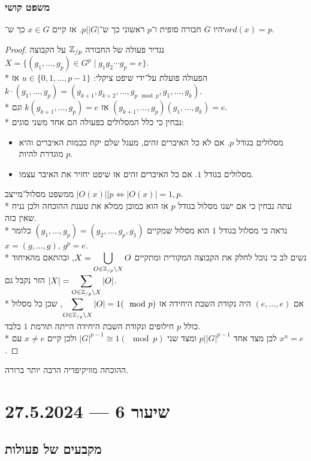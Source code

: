 \subsubsection{משפט קושי}
יהיו $G$ חבורה סופית ו־$p$ ראשוני כך ש־$p \Big| |G|$. אז קיים $x \in G$ כך ש־$ord(x) = p$.
\begin{proof}
	נגדיר פעולה של החבורה $\mathbb{Z}_{/p}$ על הקבוצה $X = \{ (g_1, \dots, g_p) \in G^p \mid g_1g_2 \cdots g_p = e\}$. \\*
	הפעולה פועלת על־ידי שיפט ציקלי: $u \in \{0, 1, \dots, p - 1\}$ אז $k \cdot (g_1, \dots, g_p) = (g_{k + 1}, g_{k + 2}, \dots, g_{p \mod p}, g_{1}, \dots, g_k)$.\\*
	אז $k (g_{k + 1}, \dots, g_p) = e$ וגם $(g_{k + 1}, \dots, g_p)(g_1, \dots, g_k) = e$. \\*
	נבחין כי כלל המסלולים בפעולה הם אחד משני סוגים:
	\begin{itemize}
		\item מסלולים בגודל $p$. אם לא כל האיברים זהים, מעגל שלם יקח ככמות האיברים והיא מוגדרת להיות $p$.
		\item מסלולים בגודל $1$. אם כל האיברים זהים אז שיפט יחזיר את האיבר עצמו.
	\end{itemize}
	ממשפט מסלול־מייצב $|O(x)| \Big| p \iff |O(x)| = 1, p$.\\*
	עתה נבחין כי אם ישנו מסלול בגודל $p$ אז הוא כמובן ממלא את טענת ההוכחה ולכן נניח שאין כזה. \\*
	נראה כי מסלול בגודל $1$ הוא מסלול שמקיים $(g_1, \dots, g_p) = (g_2, \dots, g_p, g_1)$ כלומר $x = (g, \dots, g)$, $g^p = e$.\\*
	נשים לב כי נוכל לחלק את הקבוצה המקורית ומתקיים $X = \displaystyle \bigcup_{O \in \mathbb{Z}_{/p} \backslash X} O$, ובהתאם מהאיחוד הזר נקבל גם $|X| = \displaystyle \sum_{O \in \mathbb{Z}_{/p} \backslash X} |O|$. \\*
	אם $(e, \dots, e)$ היה נקודת השבת היחידה אז $\displaystyle \sum_{O \in \mathbb{Z}_{/p} \backslash X} |O| = 1 (\mod p)$, שכן כל מסלול כולל $p$ חילופים ונקודת השבת היחידה הייתה תורמת $1$ בלבד. \\*
	לכן מצד אחד $p \Big| |G|^{p - 1}$ ומצד שני $|G|^{p - 1} \cong 1 (\mod p)$ ולכן קיים $x \ne e$ עם $x^n = e$.
\end{proof}
ההוכחה מוויקיפדיה הרבה יותר ברורה.

\section{שיעור 6 --- 27.5.2024}
\subsection{מקבעים של פעולות}
